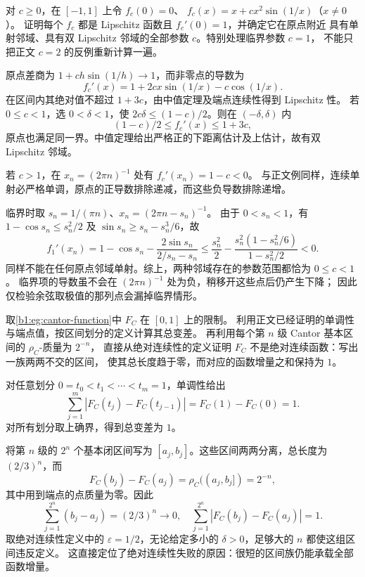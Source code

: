 \begin{exercise}\label{b1:ex:16-invertible-derivative-not-local-injective}
对 \(c\ge0\)，在 \([-1,1]\) 上令 \(f_c(0)=0\)、
\(f_c(x)=x+cx^2\sin(1/x)\)（\(x\ne0\)）。
证明每个 \(f_c\) 都是 Lipschitz 函数且 \(f_c'(0)=1\)，并确定它在原点附近
具有单射邻域、具有双 Lipschitz 邻域的全部参数 \(c\)。特别处理临界参数 \(c=1\)，
不能只把正文 \(c=2\) 的反例重新计算一遍。
\end{exercise}
\begin{solution}
原点差商为 \(1+ch\sin(1/h)\to1\)，而非零点的导数为
\[
 f_c'(x)=1+2cx\sin(1/x)-c\cos(1/x).
\]
在区间内其绝对值不超过 \(1+3c\)，由中值定理及端点连续性得到 Lipschitz 性。
若 \(0\le c<1\)，选 \(0<\delta<1\)，使
\(2c\delta\le(1-c)/2\)。则在 \((-\delta,\delta)\) 内
\[
 (1-c)/2\le f_c'(x)\le1+3c,
\]
原点也满足同一界。中值定理给出严格正的下距离估计及上估计，故有双 Lipschitz 邻域。

若 \(c>1\)，在 \(x_n=(2\pi n)^{-1}\) 处有 \(f_c'(x_n)=1-c<0\)。
与正文例同样，连续单射必严格单调，原点的正导数排除递减，而这些负导数排除递增。

临界时取 \(s_n=1/(\pi n)\)、\(x_n=(2\pi n-s_n)^{-1}\)。
由于 \(0<s_n<1\)，有 \(1-\cos s_n\le s_n^2/2\) 及
\(\sin s_n\ge s_n-s_n^3/6\)，故
\[
 f_1'(x_n)=1-\cos s_n-\frac{2\sin s_n}{2/s_n-s_n}
 \le\frac{s_n^2}{2}
     -\frac{s_n^2(1-s_n^2/6)}{1-s_n^2/2}<0.
\]
同样不能在任何原点邻域单射。综上，两种邻域存在的参数范围都恰为 \(0\le c<1\)。
临界项的导数虽不会在 \((2\pi n)^{-1}\) 处为负，稍移开这些点后仍产生下降；
因此仅检验余弦取极值的那列点会漏掉临界情形。
\end{solution}

\begin{exercise}\label{b1:ex:16-cantor-function-not-ac}
取\cref{b1:eg:cantor-function}中 \(F_C\) 在 \([0,1]\) 上的限制。
利用正文已经证明的单调性与端点值，按区间划分的定义计算其总变差。
再利用每个第 \(n\) 级 Cantor 基本区间的 \(\rho_C\)-质量为 \(2^{-n}\)，
直接从绝对连续性的定义证明 \(F_C\) 不是绝对连续函数：写出一族两两不交的区间，
使其总长度趋于零，而对应的函数增量之和保持为 \(1\)。
\end{exercise}
\begin{solution}
对任意划分 \(0=t_0<t_1<\cdots<t_m=1\)，单调性给出
\[
 \sum_{j=1}^m|F_C(t_j)-F_C(t_{j-1})|
 =F_C(1)-F_C(0)=1.
\]
对所有划分取上确界，得到总变差为 \(1\)。

将第 \(n\) 级的 \(2^n\) 个基本闭区间写为 \([a_j,b_j]\)。这些区间两两分离，总长度为 \((2/3)^n\)，而
\[
 F_C(b_j)-F_C(a_j)=\rho_C((a_j,b_j])=2^{-n},
\]
其中用到端点的点质量为零。因此
\[
 \sum_{j=1}^{2^n}(b_j-a_j)=(2/3)^n\longrightarrow0,
 \quad
 \sum_{j=1}^{2^n}|F_C(b_j)-F_C(a_j)|=1.
\]
取绝对连续性定义中的 \(\varepsilon=1/2\)，无论给定多小的 \(\delta>0\)，足够大的 \(n\) 都使这组区间违反定义。
这直接定位了绝对连续性失败的原因：很短的区间族仍能承载全部函数增量。
\end{solution}

